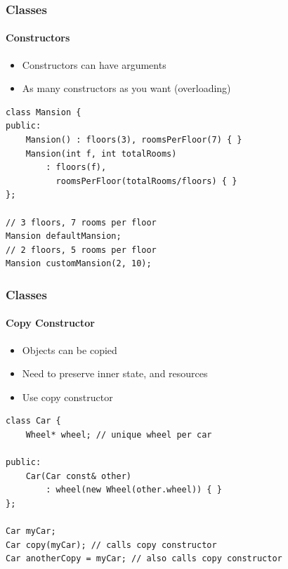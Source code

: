 \documentclass[table]{beamer}
\newcommand{\declarelesson}{\textbf{\color{themegreen}{Lesson:}} }
\begin{document}
\begin{frame}[fragile]
    \frametitle{\declarelesson Classes }
    \framesubtitle{Constructors}
    \begin{itemize}
        \item Constructors can have arguments
        \item As many constructors as you want (overloading)
    \end{itemize}
    \begin{lstlisting}[title=Constructor with arguments]
class Mansion {
public:
    Mansion() : floors(3), roomsPerFloor(7) { }
    Mansion(int f, int totalRooms)
        : floors(f),
          roomsPerFloor(totalRooms/floors) { }
};

// 3 floors, 7 rooms per floor
Mansion defaultMansion; 
// 2 floors, 5 rooms per floor
Mansion customMansion(2, 10); 
    \end{lstlisting}
\end{frame}


\begin{frame}[fragile]
    \frametitle{\declarelesson Classes }
    \framesubtitle{Copy Constructor}
    \begin{itemize}
        \item Objects can be copied
        \item Need to preserve inner state, and resources
        \item Use copy constructor
    \end{itemize}
    \begin{lstlisting}[title=Copy Constructor]
class Car {
    Wheel* wheel; // unique wheel per car

public:
    Car(Car const& other)
        : wheel(new Wheel(other.wheel)) { }
};

Car myCar;
Car copy(myCar); // calls copy constructor
Car anotherCopy = myCar; // also calls copy constructor
    \end{lstlisting}
\end{frame}
\end{document}
